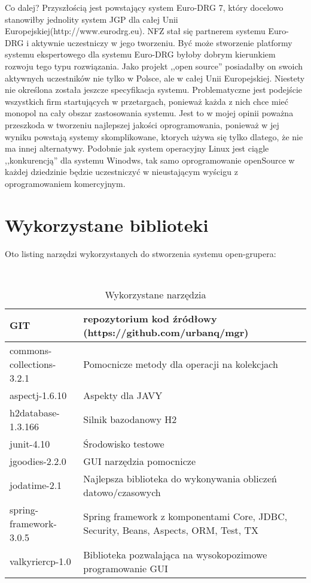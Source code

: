 Co dalej?
Przyszłością jest powstający system Euro-DRG 7, który docelowo stanowiłby jednolity system JGP dla całej Unii Europejskiej(http://www.eurodrg.eu).
NFZ stał się partnerem systemu Euro-DRG i aktywnie uczestniczy w jego tworzeniu. Być może stworzenie platformy systemu ekspertowego dla systemu Euro-DRG byłoby dobrym kierunkiem rozwoju tego typu rozwiązania. Jako projekt ,,open source'' posiadałby on swoich aktywnych uczestników nie tylko w Polsce, ale w całej Unii Europejskiej. Niestety nie określona została jeszcze specyfikacja systemu. Problematyczne jest podejście wszystkich firm startujących w przetargach, ponieważ każda z nich chce mieć monopol na cały obszar zastosowania systemu. Jest to w mojej opinii poważna przeszkoda w tworzeniu najlepszej jakości oprogramowania, ponieważ w jej wyniku powstają systemy skomplikowane, ktorych używa się tylko dlatego, że nie ma innej alternatywy. Podobnie jak system operacyjny Linux jest ciągle ,,konkurencją'' dla systemu Winodws, tak samo oprogramowanie openSource w każdej dziedzinie będzie uczestniczyć w nieustającym wyścigu z oprogramowaniem komercyjnym. 


\section{Wykorzystane biblioteki}
\label{sec:wykorzystaneBiblioteki}
Oto listing narzędzi wykorzystanych do stworzenia systemu open-grupera:
\begin{table}[h]
 \caption{Wykorzystane narzędzia}
 \small\tt
 \centering
 \vspace{0in}
 \begin{tabular}{|l|p{7cm}|}
 \hline
 GIT & repozytorium kod źródłowy (https://github.com/urbanq/mgr) \\
 \hline
 commons-collections-3.2.1 & Pomocnicze metody dla operacji na kolekcjach \\
 \hline
 aspectj-1.6.10 & Aspekty dla JAVY \\
 \hline
 h2database-1.3.166 & Silnik bazodanowy H2 \\
 \hline
 junit-4.10 & Środowisko testowe \\
 \hline
 jgoodies-2.2.0 & GUI narzędzia pomocnicze \\
 \hline
 jodatime-2.1 & Najlepsza biblioteka do wykonywania obliczeń datowo/czasowych \\
 \hline
 spring-framework-3.0.5 & Spring framework z komponentami Core, JDBC, Security, Beans, Aspects, ORM, Test, TX \\
 \hline
 valkyriercp-1.0 & Biblioteka pozwalająca na wysokopozimowe programowanie GUI \\
 \hline
 \end{tabular}
\end{table}

